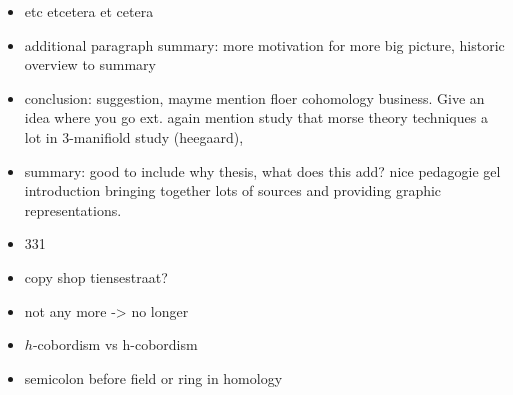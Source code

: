 \begin{itemize}
        \item etc etcetera et cetera
        \item additional paragraph summary: more motivation for more big picture, historic overview  to summary
        \item conclusion: suggestion, mayme mention floer cohomology business. Give an idea where you go ext.  again mention study that morse theory techniques a lot in 3-manifiold study (heegaard), 
        \item summary: good to include  why thesis, what does this add? nice pedagogie gel introduction bringing together lots of sources and providing graphic representations.
        \item 331
        \item copy shop tiensestraat?
        \item not any more -> no longer
        \item $h$-cobordism vs h-cobordism
        \item semicolon before field or ring in homology
\end{itemize}
